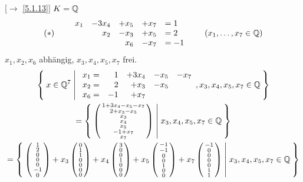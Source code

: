 \documentclass[../../main.tex]{subfiles}
\begin{document}
\begin{bsp}\label{7.3.2}
[$\to$ \ref{5.1.13}] $K = \mathbb Q$
$$(*)\qquad \begin{array}{rrrrl}
x_1 & -3x_4 & + x_5 & +x_7 & = 1\\
& x_2 & -x_3 & +x_5 & = 2\\
& & x_6 & -x_7 & =-1
\end{array}\qquad (x_1,\ldots,x_7\in \mathbb Q)$$
$x_1,x_2,x_6$ abhängig, $x_3,x_4,x_5,x_7$ frei.
\begin{multline*}
\Set{x\in\Q^7 | \begin{array}{rrrrr}
x_1 = & 1 & +3x_4 & -x_5 & -x_7\\
x_2 = & 2 & +x_3 & -x_5\\
x_6 = & -1 & +x_7
\end{array}, x_3,x_4,x_5,x_7\in\Q}\\
 =\Set{\cvec{1+3x_4-x_5-x_7\\2+x_3-x_5\\x_3\\x_4\\x_5\\-1+x_7\\x_7} | x_3,x_4,x_5,x_7\in\Q}\\
= \Set{\cvec{1\\2\\0\\0\\0\\-1\\0}+x_3\cvec{0\\1\\1\\0\\0\\0\\0}+x_4\cvec{3\\0\\0\\1\\0\\0\\0}+x_5\cvec{-1\\-1\\0\\0\\1\\0\\0}+x_7\cvec{-1\\0\\0\\0\\0\\1\\1} | x_3,x_4,x_5,x_7\in \Q}

\end{multline*}
\end{bsp}
\end{document}
